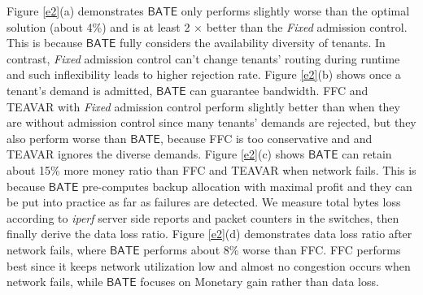 \documentclass[sigconf]{acmart}
\begin{document}
Figure \ref{e2}(a) demonstrates $\mathsf{BATE}$ only performs slightly worse than the optimal solution (about 4\%) and is at least 2 $\times$ better than the \textit{Fixed} admission control.
This is because $\mathsf{BATE}$ fully considers the availability diversity of tenants.
In contrast, \textit{Fixed} admission control can't change tenants' routing during runtime and such inflexibility leads to higher rejection rate. 
Figure \ref{e2}(b) shows once a tenant's demand is admitted, $\mathsf{BATE}$ can guarantee bandwidth.
FFC and TEAVAR with \textit{Fixed} admission control perform slightly better than when they are without admission control since many tenants' demands are rejected, but they also perform worse than $\mathsf{BATE}$, because FFC is too conservative and and TEAVAR ignores the diverse demands.
Figure \ref{e2}(c) shows $\mathsf{BATE}$ can retain about 15\% more money ratio than FFC and TEAVAR when network fails.
This is because $\mathsf{BATE}$ pre-computes backup allocation with maximal profit and they can be put into practice as far as failures are detected.
We measure total bytes loss according to \textit{iperf} server side reports and packet counters in the switches, then finally derive the data loss ratio.
Figure \ref{e2}(d) demonstrates data loss ratio after network fails, where $\mathsf{BATE}$ performs about 8\% worse than FFC.
FFC performs best since it keeps network utilization low and almost no congestion occurs when network fails, 
while $\mathsf{BATE}$ focuses on Monetary gain rather than data loss.
\end{document}
